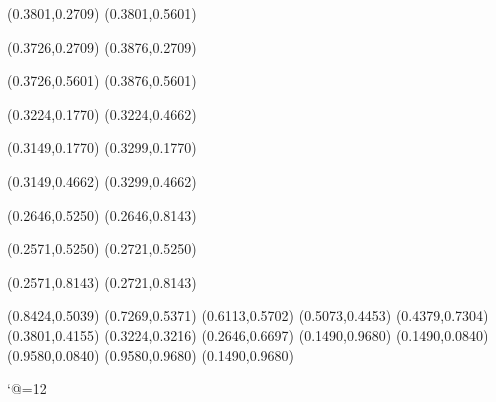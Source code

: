 \PST@Solid(0.3801,0.2709)
(0.3801,0.5601)

\PST@Solid(0.3726,0.2709)
(0.3876,0.2709)

\PST@Solid(0.3726,0.5601)
(0.3876,0.5601)

\PST@Solid(0.3224,0.1770)
(0.3224,0.4662)

\PST@Solid(0.3149,0.1770)
(0.3299,0.1770)

\PST@Solid(0.3149,0.4662)
(0.3299,0.4662)

\PST@Solid(0.2646,0.5250)
(0.2646,0.8143)

\PST@Solid(0.2571,0.5250)
(0.2721,0.5250)

\PST@Solid(0.2571,0.8143)
(0.2721,0.8143)

\PST@Diamond(0.8424,0.5039)
\PST@Diamond(0.7269,0.5371)
\PST@Diamond(0.6113,0.5702)
\PST@Diamond(0.5073,0.4453)
\PST@Diamond(0.4379,0.7304)
\PST@Diamond(0.3801,0.4155)
\PST@Diamond(0.3224,0.3216)
\PST@Diamond(0.2646,0.6697)
\PST@Border(0.1490,0.9680)
(0.1490,0.0840)
(0.9580,0.0840)
(0.9580,0.9680)
(0.1490,0.9680)

\catcode`@=12
\fi
\endpspicture
